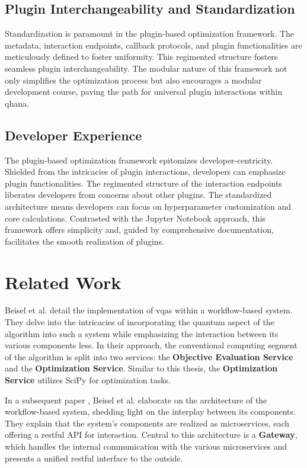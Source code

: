\documentclass[
  a4paper,  %
  twoside,  %
  bibliography=totoc,
  headsepline,
  cleardoublepage=empty,
  parskip=half,
  draft=false
]{scrbook}
\begin{document}
\section{Plugin Interchangeability and Standardization}
\label{sec:interchangeabilityAndStandardization}

Standardization is paramount in the plugin-based optimization framework.
The metadata, interaction endpoints, callback protocols, and plugin functionalities are meticulously defined to foster uniformity.
This regimented structure fosters seamless plugin interchangeability.
The modular nature of this framework not only simplifies the optimization process but also encourages a modular development course, paving the path for universal plugin interactions within \gls{qhana}.

\section{Developer Experience}
\label{sec:developerUsabilityAssessment}

The plugin-based optimization framework epitomizes developer-centricity.
Shielded from the intricacies of plugin interactions, developers can emphasize plugin functionalities.
The regimented structure of the interaction endpoints liberates developers from concerns about other plugins.
The standardized architecture means developers can focus on hyperparameter customization and core calculations.
Contrasted with the Jupyter Notebook approach, this framework offers simplicity and, guided by comprehensive documentation, facilitates the smooth realization of plugins.


\chapter{Related Work}
\label{chap:relatedWork}

Beisel et al. \cite{Beisel2023} detail the implementation of \glspl{vqa} within a workflow-based system.
They delve into the intricacies of incorporating the quantum aspect of the algorithm into such a system while emphasizing the interaction between its various components less.
In their approach, the conventional computing segment of the algorithm is split into two services: the \textbf{Objective Evaluation Service} and the \textbf{Optimization Service}.
Similar to this thesis, the \textbf{Optimization Service} utilizes SciPy for optimization tasks.

In a subsequent paper \cite{Beisel2023a}, Beisel et al. elaborate on the architecture of the workflow-based system, shedding light on the interplay between its components.
They explain that the system's components are realized as microservices, each offering a \gls{rest}ful API for interaction.
Central to this architecture is a \textbf{Gateway}, which handles the internal communication with the various microservices and presents a unified \gls{rest}ful interface to the outside.
\end{document}
